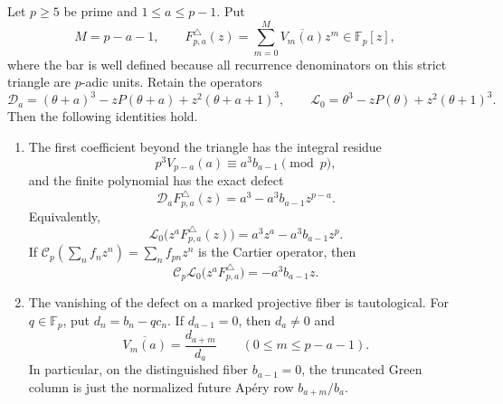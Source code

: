 \begin{proposition}
\label{prop:gap-kernel-cartier-defect}
Let $p\geq5$ be prime and $1\leq a\leq p-1$.  Put
\[
 M=p-a-1,
 \qquad
 F_{p,a}^{\triangle}(z)=
 \sum_{m=0}^{M}\overline{V_m(a)}z^m\in\mathbb F_p[z],
\]
where the bar is well defined because all recurrence denominators on this
strict triangle are $p$-adic units.  Retain the operators
\[
 \mathscr D_a=(\theta+a)^3-zP(\theta+a)
                   +z^2(\theta+a+1)^3,
 \qquad
 \mathscr L_0=\theta^3-zP(\theta)+z^2(\theta+1)^3.
\]
Then the following identities hold.

\begin{enumerate}
\item The first coefficient beyond the triangle has the integral residue
  \begin{equation}
   p^3V_{p-a}(a)\equiv a^3b_{a-1}\pmod p,
   \label{eq:green-first-Frobenius-boundary}
  \end{equation}
  and the finite polynomial has the exact defect
  \begin{equation}
   \boxed{
   \mathscr D_aF_{p,a}^{\triangle}(z)
    =a^3-a^3b_{a-1}z^{p-a}.}
   \label{eq:green-strict-triangle-defect}
  \end{equation}
  Equivalently,
  \begin{equation}
   \boxed{
   \mathscr L_0\bigl(z^aF_{p,a}^{\triangle}(z)\bigr)
    =a^3z^a-a^3b_{a-1}z^p.}
   \label{eq:green-conjugated-Frobenius-defect}
  \end{equation}
  If
  $\mathcal C_p(\sum_nf_nz^n)=\sum_nf_{pn}z^n$ is the Cartier operator,
  then
  \begin{equation}
   \mathcal C_p\mathscr L_0
    \bigl(z^aF_{p,a}^{\triangle}\bigr)
   =-a^3b_{a-1}z.
   \label{eq:green-Cartier-reads-Hasse}
  \end{equation}

\item The vanishing of the defect on a marked projective fiber is
  tautological.  For $q\in\mathbb F_p$, put $d_n=b_n-qc_n$.  If
  $d_{a-1}=0$, then $d_a\ne0$ and
  \begin{equation}
   \boxed{
   \overline{V_m(a)}=\frac{d_{a+m}}{d_a}}
   \qquad(0\leq m\leq p-a-1).
   \label{eq:green-marked-fiber-tail}
  \end{equation}
  In particular, on the distinguished fiber $b_{a-1}=0$, the truncated
  Green column is just the normalized future Ap\'ery row
  $b_{a+m}/b_a$.


\end{enumerate}
\end{proposition}
